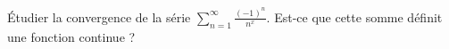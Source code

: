

\begin{exercice}\label{exo_I-1-12}

Étudier la convergence de la série $\sum_{n=1}^{\infty}\frac{ (-1)^n }{ n^x }$. Est-ce que cette somme définit une fonction continue ?

\end{exercice}
